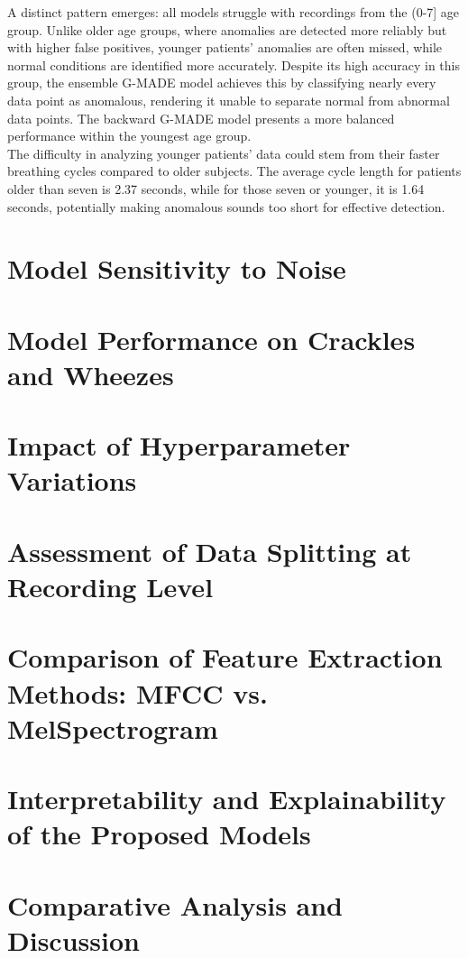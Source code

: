 A distinct pattern emerges: all models struggle with recordings from the (0-7] age group. Unlike older age groups, where anomalies are detected more reliably but with higher false positives, younger patients' anomalies are often missed, while normal conditions are identified more accurately. Despite its high accuracy in this group, the ensemble G-MADE model achieves this by classifying nearly every data point as anomalous, rendering it unable to separate normal from abnormal data points. The backward G-MADE model presents a more balanced performance within the youngest age group.\\
The difficulty in analyzing younger patients' data could stem from their faster breathing cycles compared to older subjects. The average cycle length for patients older than seven is 2.37 seconds, while for those seven or younger, it is 1.64 seconds, potentially making anomalous sounds too short for effective detection.

\section{Model Sensitivity to Noise}
\section{Model Performance on Crackles and Wheezes}
\section{Impact of Hyperparameter Variations}
\section{Assessment of Data Splitting at Recording Level}
\section{Comparison of Feature Extraction Methods: MFCC vs. MelSpectrogram}
\section{Interpretability and Explainability of the Proposed Models}
\section{Comparative Analysis and Discussion}


